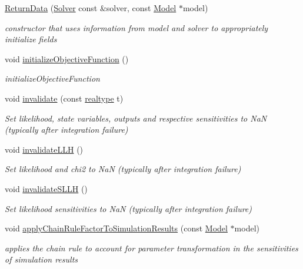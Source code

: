 \begin{DoxyCompactItemize}
\mbox{\hyperlink{classamici_1_1_return_data_a9fa947e466f4c7f55d36d1e81722abdc}{Return\+Data}} (\mbox{\hyperlink{classamici_1_1_solver}{Solver}} const \&solver, const \mbox{\hyperlink{classamici_1_1_model}{Model}} $\ast$model)
\begin{DoxyCompactList}\small\item\em constructor that uses information from model and solver to appropriately initialize fields \end{DoxyCompactList}\item 
\mbox{\label{classamici_1_1_return_data_a014198f2b584ac5b1a2b8a5dea13e411}} 
void \mbox{\hyperlink{classamici_1_1_return_data_a014198f2b584ac5b1a2b8a5dea13e411}{initialize\+Objective\+Function}} ()
\begin{DoxyCompactList}\small\item\em initialize\+Objective\+Function \end{DoxyCompactList}\item 
void \mbox{\hyperlink{classamici_1_1_return_data_ab320e46748c17908f0bd4bba240b8e92}{invalidate}} (const \mbox{\hyperlink{namespaceamici_a1bdce28051d6a53868f7ccbf5f2c14a3}{realtype}} t)
\begin{DoxyCompactList}\small\item\em Set likelihood, state variables, outputs and respective sensitivities to NaN (typically after integration failure) \end{DoxyCompactList}\item 
\mbox{\label{classamici_1_1_return_data_a03e88745280c032d3b59fd7235665e17}} 
void \mbox{\hyperlink{classamici_1_1_return_data_a03e88745280c032d3b59fd7235665e17}{invalidate\+L\+LH}} ()
\begin{DoxyCompactList}\small\item\em Set likelihood and chi2 to NaN (typically after integration failure) \end{DoxyCompactList}\item 
\mbox{\label{classamici_1_1_return_data_ae0c35d3a9e0f0d4d0903b795bc6e222f}} 
void \mbox{\hyperlink{classamici_1_1_return_data_ae0c35d3a9e0f0d4d0903b795bc6e222f}{invalidate\+S\+L\+LH}} ()
\begin{DoxyCompactList}\small\item\em Set likelihood sensitivities to NaN (typically after integration failure) \end{DoxyCompactList}\item 
void \mbox{\hyperlink{classamici_1_1_return_data_adce202dc864a1e65d8453f597de271f5}{apply\+Chain\+Rule\+Factor\+To\+Simulation\+Results}} (const \mbox{\hyperlink{classamici_1_1_model}{Model}} $\ast$model)
\begin{DoxyCompactList}\small\item\em applies the chain rule to account for parameter transformation in the sensitivities of simulation results \end{DoxyCompactList}\end{DoxyCompactItemize}
